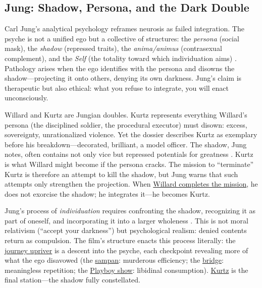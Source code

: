 \subsection*{Jung: Shadow, Persona, and the Dark Double}
\label{ssec:vi-jung}

Carl Jung's analytical psychology reframes neurosis as failed integration. The psyche is not a
unified ego but a collective of structures: the \emph{persona} (social mask), the
\emph{shadow} (repressed traits), the \emph{anima/animus} (contrasexual complement), and the
\emph{Self} (the totality toward which individuation aims) \parencite{JungArchetypes1969}.
Pathology arises when the ego identifies with the persona and disowns the shadow---projecting
it onto others, denying its own darkness. Jung's claim is therapeutic but also ethical: what
you refuse to integrate, you will enact unconsciously.

Willard and Kurtz are Jungian doubles. Kurtz represents everything Willard's persona (the
disciplined soldier, the procedural executor) must disown: excess, sovereignty,
unrationalized violence. Yet the dossier describes Kurtz as exemplary before his
breakdown---decorated, brilliant, a model officer. The shadow, Jung notes, often contains not
only vice but repressed potentials for greatness \parencite{JungArchetypes1969}. Kurtz is what
Willard might become if the persona cracks. The mission to ``terminate'' Kurtz is therefore an
attempt to kill the shadow, but Jung warns that such attempts only strengthen the projection.
When \hyperref[scene:assassination]{Willard completes the mission}, he does not exorcise the
shadow; he integrates it---he becomes Kurtz.

Jung's process of \emph{individuation} requires confronting the shadow, recognizing it as part
of oneself, and incorporating it into a larger wholeness \parencite{JungArchetypes1969}. This
is not moral relativism (``accept your darkness'') but psychological realism: denied contents
return as compulsion. The film's structure enacts this process literally: the
\hyperref[scene:upriver-journey]{journey upriver} is a descent into the psyche, each checkpoint
revealing more of what the ego disavowed (the
\hyperref[scene:sampan]{sampan}: murderous efficiency; the
\hyperref[scene:do-lung-bridge]{bridge}: meaningless repetition; the
\hyperref[scene:playboy-show]{Playboy show}: libidinal consumption).
\hyperref[scene:kurtz-compound]{Kurtz} is the final station---the shadow fully constellated.

